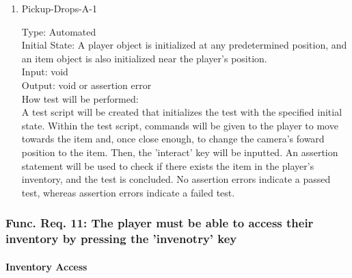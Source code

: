 \documentclass[12pt, titlepage]{article}
\begin{document}
\begin{enumerate}

\item{Pickup-Drops-A-1\\}

Type: Automated\\
					
Initial State: A player object is initialized at any predetermined position, and an item object is also initialized near the player's position.\\
					
Input: void \\
					
Output: void or assertion error \\
					
How test will be performed:\\ A test script will be created that initializes the test with the specified initial state. Within the test script, commands will be given to the player to move towards the item and, once close enough, to change the camera's foward position to the item. Then, the 'interact' key will be inputted. An assertion statement will be used to check if there exists the item in the player's inventory, and the test is concluded. No assertion errors indicate a passed test, whereas assertion errors indicate a failed test.\\

\end{enumerate}

\subsubsection{Func. Req. 11: The player must be able to access their inventory by pressing the 'invenotry' key}

\paragraph{Inventory Access}
\end{document}
